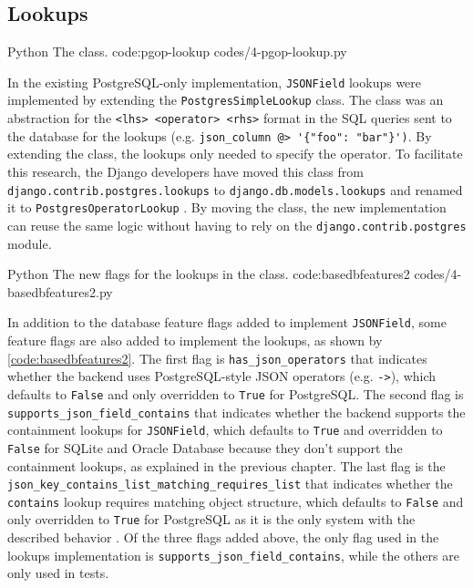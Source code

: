 \subsection{ Lookups}

\listing
{Python}
{The  class.}
{code:pgop-lookup}
{codes/4-pgop-lookup.py}

In the existing PostgreSQL-only implementation, \verb|JSONField| lookups were
implemented by extending the \verb|PostgresSimpleLookup| class. The class was
an abstraction for the \verb|<lhs> <operator> <rhs>| format in the SQL queries
sent to the database for the lookups (e.g.
\verb|json_column @> '{"foo": "bar"}')|. By extending the class, the lookups
only needed to specify the operator. To facilitate this research, the Django
developers have moved this class from \verb|django.contrib.postgres.lookups| to
\verb|django.db.models.lookups| and renamed it to \verb|PostgresOperatorLookup|
\cite{gh-django:pgop-lookup}. By moving the class, the new implementation can
reuse the same logic without having to rely on the
\verb|django.contrib.postgres| module.

\listing
{Python}
{The new flags for the  lookups in the  class.}
{code:basedbfeatures2}
{codes/4-basedbfeatures2.py}

In addition to the database feature flags added to implement \verb|JSONField|,
some feature flags are also added to implement the lookups, as shown by
\autoref{code:basedbfeatures2}. The first flag is \verb|has_json_operators|
that indicates whether the backend uses PostgreSQL-style JSON operators (e.g.
\verb|->|), which defaults to \verb|False| and only overridden to \verb|True|
for PostgreSQL. The second flag is \verb|supports_json_field_contains| that
indicates whether the backend supports the containment lookups for
\verb|JSONField|, which defaults to \verb|True| and overridden to \verb|False|
for SQLite and Oracle Database because they don't support the containment
lookups, as explained in the previous chapter. The last flag is the
\verb|json_key_contains_list_matching_requires_list| that indicates whether the
\verb|contains| lookup requires matching object structure, which defaults to
\verb|False| and only overridden to \verb|True| for PostgreSQL as it is the
only system with the described behavior \cite{postgres:json}. Of the three
flags added above, the only flag used in the lookups implementation is
\verb|supports_json_field_contains|, while the others are only used in tests.

